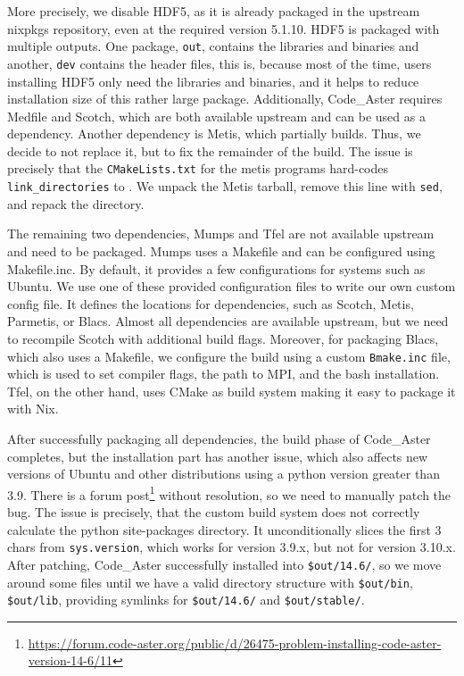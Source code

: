 \documentclass{eceasst}
\begin{document}
More precisely, we disable HDF5, as it is already packaged in the upstream nixpkgs repository, even at the required version 5.1.10.
HDF5 is packaged with multiple outputs.
One package, \texttt{out}, contains the libraries and binaries and another, \texttt{dev} contains the header files, this is, because most of the time, users installing HDF5 only need the libraries and binaries, and it helps to reduce installation size of this rather large package.
Additionally, Code\_Aster requires Medfile and Scotch, which are both available upstream and can be used as a dependency.
Another dependency is Metis, which partially builds. Thus, we decide to not replace it, but to fix the remainder of the build.
The issue is precisely that the \texttt{CMakeLists.txt} for the metis programs hard-codes \texttt{link\_directories} to . We unpack the Metis tarball, remove this line with \texttt{sed}, and repack the directory.

The remaining two dependencies, Mumps and Tfel are not available upstream and need to be packaged.
Mumps uses a Makefile and can be configured using Makefile.inc. By default, it provides a few configurations for systems such as Ubuntu. We use one of these provided configuration files to write our own custom config file.
It defines the locations for dependencies, such as Scotch, Metis, Parmetis, or Blacs.
Almost all dependencies are available upstream, but we need to recompile Scotch with additional build flags.
Moreover, for packaging Blacs, which also uses a Makefile, we configure the build using a custom \texttt{Bmake.inc} file, which is used to set compiler flags, the path to MPI, and the bash installation.
Tfel, on the other hand, uses CMake as build system making it easy to package it with Nix.

After successfully packaging all dependencies, the build phase of Code\_Aster completes, but the installation part has another issue, which also affects new versions of Ubuntu and other distributions using a python version greater than 3.9.
There is a forum post\footnote{\url{https://forum.code-aster.org/public/d/26475-problem-installing-code-aster-version-14-6/11}} without resolution, so we need to manually patch the bug.
The issue is precisely, that the custom build system does not correctly calculate the python site-packages directory. It unconditionally slices the first 3 chars from \texttt{sys.version}, which works for version 3.9.x, but not for version 3.10.x.
After patching, Code\_Aster successfully installed into \texttt{\$out/14.6/}, so we move around some files until we have a valid directory structure with \texttt{\$out/bin}, \texttt{\$out/lib}, providing symlinks for \texttt{\$out/14.6/} and \texttt{\$out/stable/}.
\end{document}
